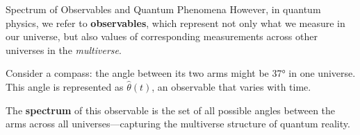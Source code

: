 \documentclass[12pt, aspectratio=169]{beamer}
\begin{document}
\begin{frame}{Spectrum of Observables and Quantum Phenomena}
However, in quantum physics, we refer to \textbf{observables}, which represent not only what we measure in our universe, but also values of corresponding measurements across other universes in the \textit{multiverse}.

Consider a compass: the angle between its two arms might be 37° in one universe. This angle is represented as $\hat{\theta}(t)$, an observable that varies with time.

\vspace{1em}

The \textbf{spectrum} of this observable is the set of all possible angles between the arms across all universes—capturing the multiverse structure of quantum reality.
\end{frame}
\end{document}
